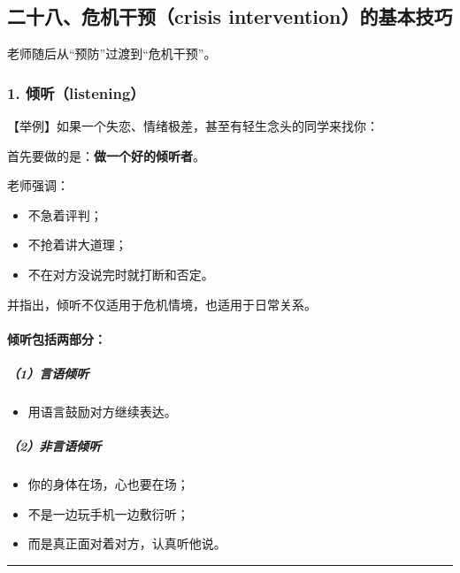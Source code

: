 \documentclass[
  chinese,
  9pt,
  a4paper,
]{ctexart}
\providecommand{\tightlist}{%
  \setlength{\itemsep}{0pt}\setlength{\parskip}{0pt}}
\begin{document}
\subsection{二十八、危机干预（crisis
intervention）的基本技巧}\label{ux4e8cux5341ux516bux5371ux673aux5e72ux9884crisis-interventionux7684ux57faux672cux6280ux5de7}

老师随后从``预防''过渡到``危机干预''。

\subsubsection{1. 倾听（listening）}\label{ux503eux542clistening}

【举例】如果一个失恋、情绪极差，甚至有轻生念头的同学来找你：

首先要做的是：\textbf{做一个好的倾听者}。

老师强调：

\begin{itemize}
\tightlist
\item
  不急着评判；
\item
  不抢着讲大道理；
\item
  不在对方没说完时就打断和否定。
\end{itemize}

并指出，倾听不仅适用于危机情境，也适用于日常关系。

\paragraph{倾听包括两部分：}\label{ux503eux542cux5305ux62ecux4e24ux90e8ux5206}

\subparagraph{（1）言语倾听}\label{ux8a00ux8bedux503eux542c}

\begin{itemize}
\tightlist
\item
  用语言鼓励对方继续表达。
\end{itemize}

\subparagraph{（2）非言语倾听}\label{ux975eux8a00ux8bedux503eux542c}

\begin{itemize}
\tightlist
\item
  你的身体在场，心也要在场；
\item
  不是一边玩手机一边敷衍听；
\item
  而是真正面对着对方，认真听他说。
\end{itemize}

\begin{center}\rule{0.5\linewidth}{0.5pt}\end{center}
\end{document}
